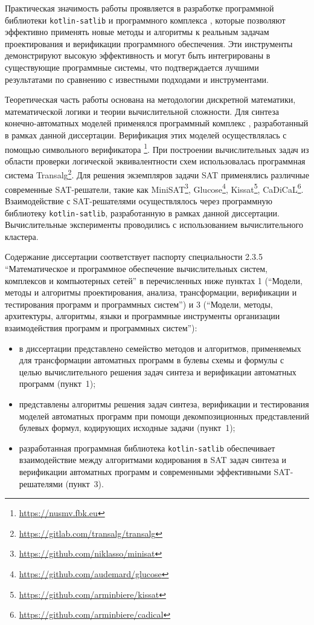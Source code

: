 Практическая значимость работы проявляется в разработке программной библиотеки \texttt{kotlin-satlib} и программного комплекса , которые позволяют эффективно применять новые методы и алгоритмы к реальным задачам проектирования и верификации программного обеспечения.
Эти инструменты демонстрируют высокую эффективность и могут быть интегрированы в существующие программные системы, что подтверждается лучшими результатами по сравнению с известными подходами и инструментами.


\methods
%
Теоретическая часть работы основана на методологии дискретной математики, математической логики и теории вычислительной сложности.
Для синтеза конечно-автоматных моделей применялся программный комплекс , разработанный в рамках данной диссертации.
Верификация этих моделей осуществлялась с помощью символьного верификатора \footnote{\url{https://nusmv.fbk.eu}}.
При построении вычислительных задач из области проверки логической эквивалентности схем использовалась программная система Transalg\footnote{\url{https://gitlab.com/transalg/transalg}}.
Для решения экземпляров задачи SAT применялись различные современные SAT-решатели, такие как MiniSAT\footnote{\url{https://github.com/niklasso/minisat}}, Glucose\footnote{\url{https://github.com/audemard/glucose}}, Kissat\footnote{\url{https://github.com/arminbiere/kissat}}, CaDiCaL\footnote{\url{https://github.com/arminbiere/cadical}}.
Взаимодействие с SAT-решателями осуществлялось через программную библиотеку \texttt{kotlin-satlib}, разработанную в рамках данной диссертации.
Вычислительные эксперименты проводились с использованием вычислительного кластера.


\relevance
%
Содержание диссертации соответствует паспорту специальности 2.3.5 \enquote{Математическое и программное обеспечение вычислительных систем, комплексов и компьютерных сетей} в перечисленных ниже пунктах 1 (\enquote{Модели, методы и алгоритмы проектирования, анализа, трансформации, верификации и тестирования программ и программных систем}) и 3 (\enquote{Модели, методы, архитектуры, алгоритмы, языки и программные инструменты организации взаимодействия программ и программных систем}):
\begin{itemize}[beginpenalty=10000]
    \item в диссертации представлено семейство методов и алгоритмов, применяемых для трансформации автоматных программ в булевы схемы и формулы с целью вычислительного решения задач синтеза и верификации автоматных программ (пункт~1);
    \item представлены алгоритмы решения задач синтеза, верификации и тестирования моделей автоматных программ при помощи декомпозиционных представлений булевых формул, кодирующих исходные задачи (пункт~1);
    \item разработанная программная библиотека \texttt{kotlin-satlib} обеспечивает взаимодействие между алгоритмами кодирования в SAT задач синтеза и верификации автоматных программ и современными эффективными SAT-решателями (пункт~3).
\end{itemize}


